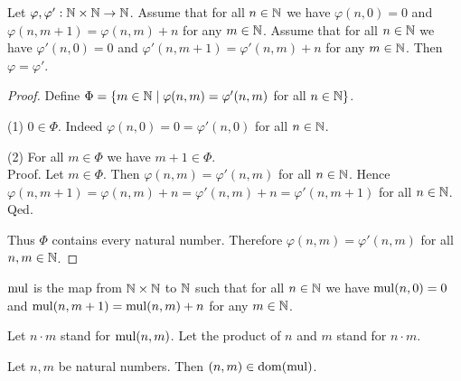 \documentclass[../arithmetic.tex]{subfiles}
\begin{document}
  \begin{forthel}
    \begin{lemma}
      Let $\varphi, \varphi' : \mathbb{N} \times \mathbb{N} \to \mathbb{N}$.
      Assume that for all $n \in \mathbb{N}$ we have $\varphi(n, 0) = 0$ and
      $\varphi(n, m \plus 1) = \varphi(n,m) \plus n$ for any $m \in \mathbb{N}$.
      Assume that for all $n \in \mathbb{N}$ we have $\varphi'(n, 0) = 0$ and
      $\varphi'(n, m \plus 1) = \varphi'(n,m) \plus n$ for any $m \in \mathbb{N}$.
      Then $\varphi = \varphi'$.
    \end{lemma}
    \begin{proof}
      Define $\Phi = \{ m \in \mathbb{N} \mid \varphi(n,m) = \varphi'(n,m)$ for
      all $n \in \mathbb{N} \}$.

      (1) $0 \in \Phi$.
      Indeed $\varphi(n,0) = 0 = \varphi'(n,0)$ for all $n \in \mathbb{N}$.

      (2) For all $m \in \Phi$ we have $m \plus 1 \in \Phi$. \\
      Proof.
        Let $m \in \Phi$.
        Then $\varphi(n,m) = \varphi'(n,m)$ for all $n \in \mathbb{N}$.
        Hence $\varphi(n, m \plus 1)
          = \varphi(n,m) \plus n
          = \varphi'(n,m) \plus n
          = \varphi'(n, m \plus 1)$
        for all $n \in \mathbb{N}$.
      Qed.

      Thus $\Phi$ contains every natural number.
      Therefore $\varphi(n,m) = \varphi'(n,m)$ for all $n, m \in \mathbb{N}$.
    \end{proof}
  \end{forthel}

  \begin{forthel}
    \begin{definition}
      $\mathrm{mul}$ is the map from $\mathbb{N} \times \mathbb{N}$ to $\mathbb{N}$ such that for all
      $n \in \mathbb{N}$ we have $\mathrm{mul}(n, 0) = 0$ and $\mathrm{mul}(n, m + 1) =
      \mathrm{mul}(n, m) + n$ for any $m \in \mathbb{N}$.
    \end{definition}

    Let $n \cdot m$ stand for $\mathrm{mul}(n, m)$.
    Let the product of $n$ and $m$ stand for $n \cdot m$.
  \end{forthel}

  \begin{forthel}
    \begin{lemma}
      Let $n, m$ be natural numbers.
      Then $(n,m) \in \operatorname{dom}(\mathrm{mul})$.
    \end{lemma}
  \end{forthel}
\end{document}
